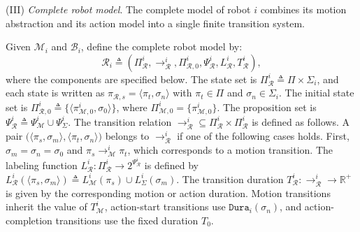 (III) \emph{Complete robot model}.
The complete model of robot $i$ combines its motion abstraction and its action
model into a single finite transition system.

\begin{definition}
\label{ch03:full-model}
Given $\mathcal{M}_i$ and $\mathcal{B}_i$, define the complete robot model by:
\begin{equation}
\label{ch03:eq:Ri}
\mathcal{R}_i \triangleq
(\Pi_{\mathcal{R}}^i, \longrightarrow_{\mathcal{R}}^i,
 \Pi_{\mathcal{R},0}^i, \Psi_{\mathcal{R}}^i,
 L_{\mathcal{R}}^i, T_{\mathcal{R}}^i),
\end{equation}
where the components are specified below.
The state set is
$\Pi_{\mathcal{R}}^i \triangleq \Pi \times \Sigma_i$, and each state is written
as $\pi_{\mathcal{R},s}=\langle \pi_t,\sigma_n \rangle$ with
$\pi_t \in \Pi$ and $\sigma_n \in \Sigma_i$. The initial state set is
$\Pi_{\mathcal{R},0}^i \triangleq
\{\langle \pi_{\mathcal{M},0}^i,\sigma_0 \rangle\}$, where
$\Pi_{\mathcal{M},0}^i=\{\pi_{\mathcal{M},0}^i\}$. The proposition set is
$\Psi_{\mathcal{R}}^i \triangleq \Psi_{\mathcal{M}}^i \cup \Psi_{\Sigma}^i$.
The transition relation
$\longrightarrow_{\mathcal{R}}^i \subseteq
\Pi_{\mathcal{R}}^i \times \Pi_{\mathcal{R}}^i$
is defined as follows. A pair
$\big(\langle \pi_s,\sigma_m \rangle,\langle \pi_t,\sigma_n \rangle\big)$
belongs to $\longrightarrow_{\mathcal{R}}^i$ if one of the following cases
holds. First, $\sigma_m=\sigma_n=\sigma_0$ and
$\pi_s \longrightarrow_{\mathcal{M}}^i \pi_t$, which corresponds to a motion
transition. 
The labeling function
$L_{\mathcal{R}}^i : \Pi_{\mathcal{R}}^i \rightarrow 2^{\Psi_{\mathcal{R}}^i}$
is defined by
$L_{\mathcal{R}}^i(\langle \pi_s,\sigma_m \rangle) \triangleq
L_{\mathcal{M}}^i(\pi_s) \cup L_{\Sigma}^i(\sigma_m)$. The transition duration
$T_{\mathcal{R}}^i : \longrightarrow_{\mathcal{R}}^i \rightarrow \mathbb{R}^+$
is given by the corresponding motion or action duration. Motion transitions
inherit the value of $T_{\mathcal{M}}^i$, action-start transitions use
$\texttt{Dura}_i(\sigma_n)$, and action-completion transitions use the fixed
duration $T_0$.
\end{definition}

